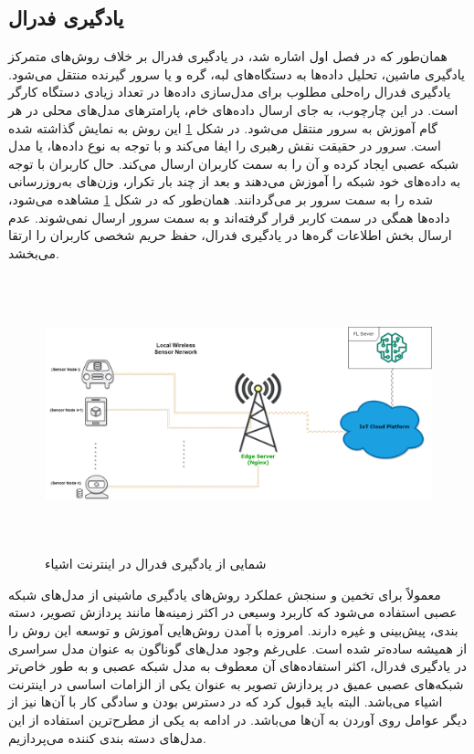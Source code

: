 \subsection{یادگیری فدرال}
    همان‌طور که در فصل اول اشاره شد، در یادگیری فدرال بر خلاف روش‌های متمرکز یادگیری ماشین، تحلیل داده‌ها به دستگاه‌های لبه، گره و یا سرور گیرنده منتقل می‌شود. یادگیری فدرال راه‌حلی مطلوب برای مدل‌سازی داده‌ها در تعداد زیادی دستگاه کارگر است. در این چارچوب، به جای ارسال داده‌های خام، پارامترهای مدل‌های محلی در هر گام آموزش به سرور منتقل می‌شود. در شکل \ref{federal} این روش به نمایش گذاشته شده است.
    سرور در حقیقت نقش رهبری را ایفا می‌کند و با توجه به نوع داده‌ها، یا مدل شبکه عصبی ایجاد کرده و آن را به سمت کاربران ارسال می‌کند. حال کاربران با توجه به داده‌های خود شبکه را آموزش می‌دهند و بعد از چند بار تکرار، وزن‌های به‌روزرسانی شده را به سمت سرور بر می‌گردانند. همان‌طور که در شکل \ref{federal} مشاهده می‌شود، داده‌ها همگی در سمت کاربر قرار گرفته‌اند و به سمت سرور ارسال نمی‌شوند. عدم ارسال بخش اطلاعات گره‌ها در یادگیری فدرال، حفظ حریم شخصی کاربران را ارتقا می‌بخشد.
    \begin{figure}[H] \centering
      \includegraphics[height=8cm,width=15cm]{./IoT/State Diagram-Inter-connection.drawio.png}
      \caption{ شمایی از یادگیری فدرال در اینترنت اشیاء}
      \label{federal}
      \centering \end{figure}



      معمولاً برای تخمین و سنجش عملکرد روش‌های یادگیری ماشینی از مدل‌های شبکه عصبی استفاده می‌شود که کاربرد وسیعی در اکثر زمینه‌ها مانند پردازش تصویر، دسته بندی، پیش‌بینی و غیره دارند. امروزه با آمدن روش‌هایی آموزش و توسعه این روش‌ را از همیشه ساده‌تر شده است. علی‌رغم وجود مدل‌های گوناگون به عنوان مدل سراسری در یادگیری فدرال، اکثر استفاده‌های آن معطوف به مدل شبکه عصبی و به طور خاص‌تر شبکه‌های عصبی عمیق در پردازش تصویر به عنوان یکی از الزامات اساسی در اینترنت اشیاء می‌باشد. البته باید قبول کرد که در دسترس بودن و سادگی کار با آن‌ها نیز از دیگر عوامل روی‌ آوردن به آن‌ها می‌باشد. در ادامه به یکی از مطرح‌ترین استفاده از این مدل‌های دسته بندی کننده می‌پردازیم.



